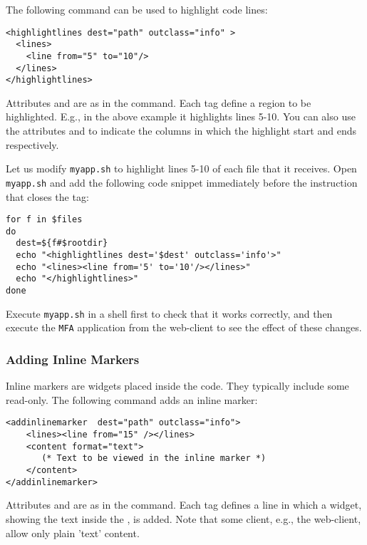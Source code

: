 The following command can be used to highlight code lines:

\medskip
\begin{lstlisting}
<highlightlines dest="path" outclass="info" > 
  <lines>
    <line from="5" to="10"/>
  </lines>
</highlightlines>
\end{lstlisting}

\medskip
\noindent
Attributes  and  are as in the 
command. Each  tag define a region to be highlighted. E.g.,
in the above example it highlights lines 5-10. You can also use the
attributes  and  to indicate the columns in
which the highlight start and ends respectively.

Let us modify \texttt{myapp.sh} to highlight lines 5-10 of each file
that it receives. Open \texttt{myapp.sh} and add the following code
snippet immediately before the instruction that closes the
 tag:

\medskip
\begin{lstlisting}[style=script]
for f in $files 
do
  dest=${f#$rootdir}
  echo "<highlightlines dest='$dest' outclass='info'>"
  echo "<lines><line from='5' to='10'/></lines>"
  echo "</highlightlines>"
done
\end{lstlisting}

\medskip
\noindent
Execute \texttt{myapp.sh} in a shell first to check that it works
correctly, and then execute the \texttt{MFA} application from the
web-client to see the effect of these changes.

\subsubsection{Adding Inline Markers}

Inline markers are widgets placed inside the code. They typically
include some read-only. The following command adds an inline marker:

\medskip
\begin{lstlisting}
<addinlinemarker  dest="path" outclass="info"> 
    <lines><line from="15" /></lines>
    <content format="text">
       (* Text to be viewed in the inline marker *)
    </content>
</addinlinemarker>
\end{lstlisting}

\medskip
\noindent
Attributes  and  are as in the 
command. Each  tag defines a line in which a widget, showing
the text inside the , is added. Note that some client,
e.g., the web-client, allow only plain 'text' content.

